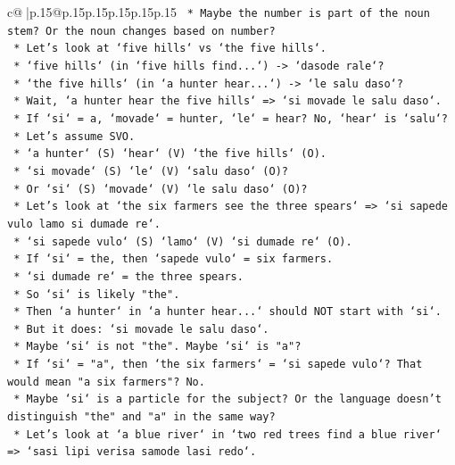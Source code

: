 \documentclass{article}
\begin{document}
{\begin{supertabular}{c@{$\;$}|p{.15\linewidth}@{}p{.15\linewidth}p{.15\linewidth}p{.15\linewidth}p{.15\linewidth}p{.15\linewidth}}
{{{\texttt{        *   Maybe the number is part of the noun stem? Or the noun changes based on number?} \\
\texttt{        *   Let's look at `five hills` vs `the five hills`.} \\
\texttt{            *   `five hills` (in `five hills find...`) {-}> `dasode rale`?} \\
\texttt{            *   `the five hills` (in `a hunter hear...`) {-}> `le salu daso`?} \\
\texttt{            *   Wait, `a hunter hear the five hills` => `si movade le salu daso`.} \\
\texttt{            *   If `si` = a, `movade` = hunter, `le` = hear? No, `hear` is `salu`?} \\
\texttt{            *   Let's assume SVO.} \\
\texttt{            *   `a hunter` (S) `hear` (V) `the five hills` (O).} \\
\texttt{            *   `si movade` (S) `le` (V) `salu daso` (O)?} \\
\texttt{            *   Or `si` (S) `movade` (V) `le salu daso` (O)?} \\
\texttt{            *   Let's look at `the six farmers see the three spears` => `si sapede vulo lamo si dumade re`.} \\
\texttt{            *   `si sapede vulo` (S) `lamo` (V) `si dumade re` (O).} \\
\texttt{            *   If `si` = the, then `sapede vulo` = six farmers.} \\
\texttt{            *   `si dumade re` = the three spears.} \\
\texttt{            *   So `si` is likely "the".} \\
\texttt{            *   Then `a hunter` in `a hunter hear...` should NOT start with `si`.} \\
\texttt{            *   But it does: `si movade le salu daso`.} \\
\texttt{            *   Maybe `si` is not "the". Maybe `si` is "a"?} \\
\texttt{            *   If `si` = "a", then `the six farmers` = `si sapede vulo`? That would mean "a six farmers"? No.} \\
\texttt{            *   Maybe `si` is a particle for the subject? Or the language doesn't distinguish "the" and "a" in the same way?} \\
\texttt{            *   Let's look at `a blue river` in `two red trees find a blue river` => `sasi lipi verisa samode lasi redo`.} \\
}}}
\end{supertabular}}
\end{document}
